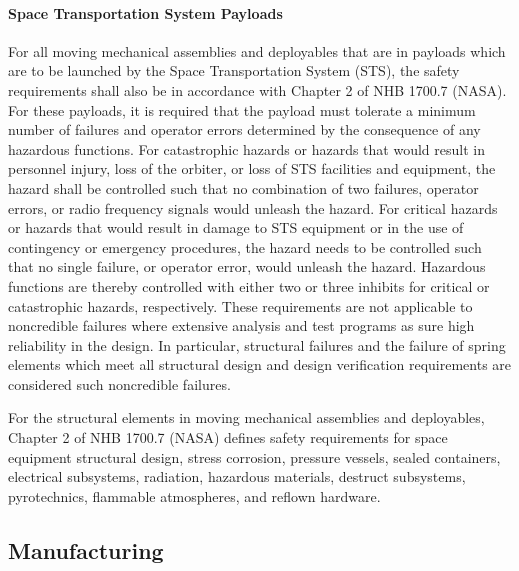 \documentclass[12pt]{article}
\begin{document}
\paragraph{Space Transportation System Payloads} %
For all moving mechanical assemblies and deployables that are in payloads which are to be launched by the Space Transportation System (STS), the safety requirements shall also be in accordance with Chapter 2 of NHB 1700.7 (NASA). 
For these payloads, it is required that the payload must tolerate a minimum number of failures and operator errors determined by the consequence of any hazardous functions. 
For catastrophic hazards or hazards that would result in personnel injury, loss of the orbiter, or loss of STS facilities and equipment, the hazard shall be controlled such that no combination of two failures, operator errors, or radio frequency signals would unleash the hazard. 
For critical hazards or hazards that would result in damage to STS equipment or in the use of contingency or emergency procedures, the hazard needs to be controlled such that no single failure, or operator error, would unleash the hazard. 
Hazardous functions are thereby controlled with either two or three inhibits for critical or catastrophic hazards, respectively. 
These requirements are not applicable to noncredible failures where extensive analysis and test programs as sure high reliability in the design. 
In particular, structural failures and the failure of spring elements which meet all structural design and design verification requirements are considered such noncredible failures.

For the structural elements in moving mechanical assemblies and deployables, Chapter 2 of NHB 1700.7 (NASA) defines safety requirements for space equipment structural design, stress corrosion, pressure vessels, sealed containers, electrical subsystems, radiation, hazardous materials, destruct subsystems, pyrotechnics, flammable atmospheres, and reflown hardware.

\subsection{Manufacturing} %
\end{document}
